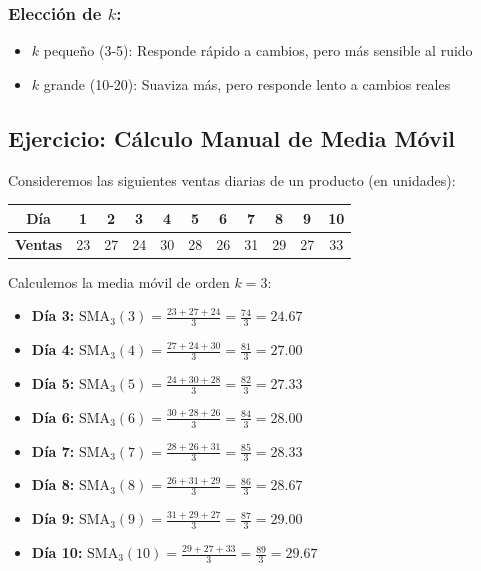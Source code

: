 \documentclass[12pt]{article}
\begin{document}
\subsubsection{Elección de $k$:}
\begin{itemize}
    \item $k$ pequeño (3-5): Responde rápido a cambios, pero más sensible al ruido
    \item $k$ grande (10-20): Suaviza más, pero responde lento a cambios reales
\end{itemize}

\subsection{Ejercicio: Cálculo Manual de Media Móvil}

Consideremos las siguientes ventas diarias de un producto (en unidades):

\begin{center}
\begin{tabular}{|c|c|c|c|c|c|c|c|c|c|c|}
\hline
\textbf{Día} & 1 & 2 & 3 & 4 & 5 & 6 & 7 & 8 & 9 & 10 \\
\hline
\textbf{Ventas} & 23 & 27 & 24 & 30 & 28 & 26 & 31 & 29 & 27 & 33 \\
\hline
\end{tabular}
\end{center}

Calculemos la media móvil de orden $k=3$:

\begin{itemize}
    \item \textbf{Día 3:} $\text{SMA}_3(3) = \frac{23 + 27 + 24}{3} = \frac{74}{3} = 24.67$

    \item \textbf{Día 4:} $\text{SMA}_3(4) = \frac{27 + 24 + 30}{3} = \frac{81}{3} = 27.00$

    \item \textbf{Día 5:} $\text{SMA}_3(5) = \frac{24 + 30 + 28}{3} = \frac{82}{3} = 27.33$

    \item \textbf{Día 6:} $\text{SMA}_3(6) = \frac{30 + 28 + 26}{3} = \frac{84}{3} = 28.00$

    \item \textbf{Día 7:} $\text{SMA}_3(7) = \frac{28 + 26 + 31}{3} = \frac{85}{3} = 28.33$

    \item \textbf{Día 8:} $\text{SMA}_3(8) = \frac{26 + 31 + 29}{3} = \frac{86}{3} = 28.67$

    \item \textbf{Día 9:} $\text{SMA}_3(9) = \frac{31 + 29 + 27}{3} = \frac{87}{3} = 29.00$

    \item \textbf{Día 10:} $\text{SMA}_3(10) = \frac{29 + 27 + 33}{3} = \frac{89}{3} = 29.67$
\end{itemize}
\end{document}
